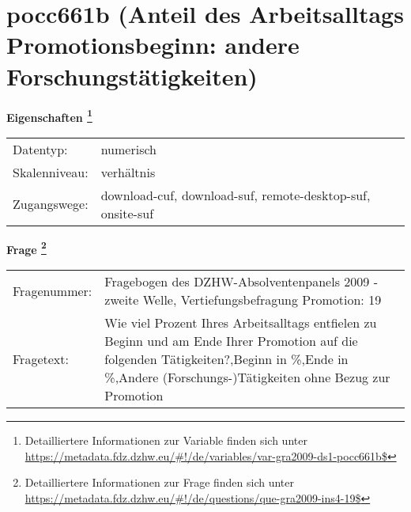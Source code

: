 
    \setcounter{footnote}{0}

    \vspace*{-1.8cm}
	\section{pocc661b (Anteil des Arbeitsalltags Promotionsbeginn: andere Forschungstätigkeiten)}
	\label{section:pocc661b}



    \vspace*{0.5cm}
    \noindent\textbf{Eigenschaften
	\footnote{Detailliertere Informationen zur Variable finden sich unter
		\url{https://metadata.fdz.dzhw.eu/\#!/de/variables/var-gra2009-ds1-pocc661b$}}}\\
	\begin{tabularx}{\hsize}{@{}lX}
	Datentyp: & numerisch \\
	Skalenniveau: & verhältnis \\
	Zugangswege: &
	  download-cuf, 
	  download-suf, 
	  remote-desktop-suf, 
	  onsite-suf
 \\
    \end{tabularx}



				\vspace*{0.5cm}
                \noindent\textbf{Frage
	                \footnote{Detailliertere Informationen zur Frage finden sich unter
		              \url{https://metadata.fdz.dzhw.eu/\#!/de/questions/que-gra2009-ins4-19$}}}\\
				\begin{tabularx}{\hsize}{@{}lX}
					Fragenummer: &
					  Fragebogen des DZHW-Absolventenpanels 2009 - zweite Welle, Vertiefungsbefragung Promotion:
					  19
 \\
					Fragetext: & Wie viel Prozent Ihres Arbeitsalltags entfielen zu Beginn und am Ende Ihrer Promotion auf die folgenden Tätigkeiten?,Beginn in \%,Ende in \%,Andere (Forschungs-)Tätigkeiten ohne Bezug zur Promotion \\
				\end{tabularx}





